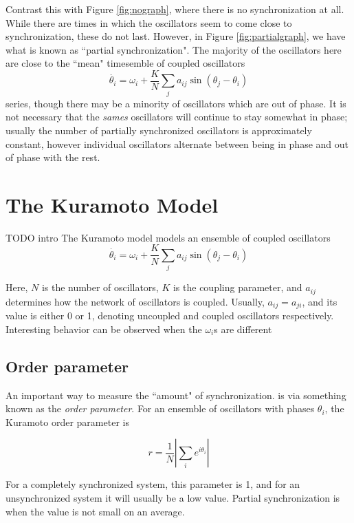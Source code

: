 \documentclass[12pt]{article}
\begin{document}
Contrast this with Figure \ref{fig:nograph}, where there is no synchronization at all. While there are times in which the oscillators seem to come close to synchronization, these do not last. However, in Figure \ref{fig:partialgraph}, we have what is known as ``partial synchronization". The majority of the oscillators here are close to the ``mean" timesemble of coupled oscillators
$$\dot{\theta_i} = \omega_i + \frac{K}{N}\sum_j a_{ij}\sin(\theta_j - \theta_i) $$
 series, though there may be a minority of oscillators which are out of phase. It is not necessary that the \emph{sames} oscillators will continue to stay somewhat in phase; usually the number of partially synchronized oscillators is approximately constant, however individual oscillators alternate between being in phase and out of phase with the rest.



\section{The Kuramoto Model}
TODO intro
The Kuramoto model models an ensemble of coupled oscillators
$$\dot{\theta_i} = \omega_i + \frac{K}{N}\sum_j a_{ij}\sin(\theta_j - \theta_i) $$

Here, $N$ is the number of oscillators, $K$ is the coupling parameter, and $a_{ij}$ determines how the network of oscillators is coupled. Usually, $a_{ij}=a_{ji}$, and its value is either 0 or 1, denoting uncoupled and coupled oscillators respectively. Interesting behavior can be observed when the $\omega_i$s are different

\subsection{Order parameter}
An important way to measure the ``amount" of synchronization. is via something known as the \emph{order parameter}. For an ensemble of oscillators with phases $\theta_i$, the Kuramoto order parameter is 

$$r = \frac1{N}\left|\sum_i e^{i\theta_i}\right|$$

For a completely synchronized system, this parameter is 1, and for an unsynchronized system it will usually be a low value. Partial synchronization is when the value is not small on an average.
\end{document}
